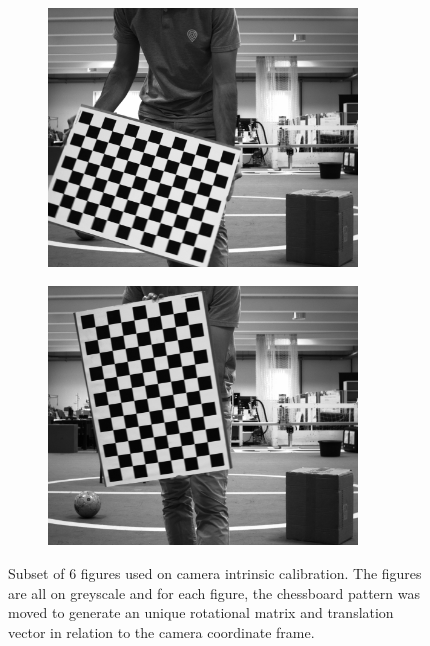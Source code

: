 \begin{figure}[h]
\begin{subfigure}[c]{0.30\textwidth}
		\includegraphics[width=0.9\textwidth]{img/camera-calibration/left-0044.png}
	\end{subfigure}
	\begin{subfigure}[c]{0.30\textwidth}
		\includegraphics[width=0.9\textwidth]{img/camera-calibration/left-0048.png}
	\end{subfigure}
	
	\caption{Subset of 6 figures used on camera intrinsic calibration. The figures are all on greyscale and for each figure, the chessboard pattern was moved to generate an unique rotational matrix and translation vector in relation to the camera coordinate frame.}
	\label{fig:camera-calibration-images}
\end{figure}

